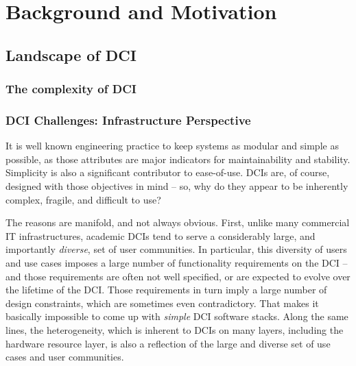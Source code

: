 \documentclass[a4paper,12pt]{article}
\newcommand{\I}[1]{\textit{#1}}
\begin{document}
 


% 

\section{Background and Motivation}

\subsection{Landscape of DCI}
\label{ssec.dci.landscape}

\subsubsection{The complexity of DCI}
\label{ssec.dci.complex}

\subsubsection{DCI Challenges: Infrastructure Perspective}

  It is well known engineering practice to keep systems as modular and
  simple as possible, as those attributes are major indicators for
  maintainability and stability.  Simplicity is also a significant
  contributor to ease-of-use.  DCIs are, of course, designed with
  those objectives in mind -- so, why do they appear to be inherently
  complex, fragile, and difficult to use?

  The reasons are manifold, and not always obvious.  First, unlike
  many commercial IT infrastructures, academic DCIs tend to serve a
  considerably large, and importantly \I{diverse}, set of user
  communities.  In particular, this diversity of users and use cases
  imposes a large number of functionality requirements on the DCI --
  and those requirements are often not well specified, or are expected
  to evolve over the lifetime of the DCI.  Those requirements in turn
  imply a large number of design constraints, which are sometimes even
  contradictory.  That makes it basically impossible to come up with
  \I{simple} DCI software stacks.  Along the same lines, the
  heterogeneity, which is inherent to DCIs on many layers, including
  the hardware resource layer, is also a reflection of the large and
  diverse set of use cases and user communities.
\end{document}

